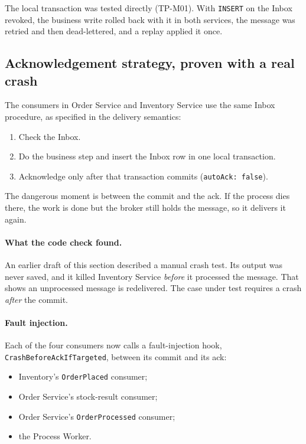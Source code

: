 \documentclass[a4paper]{report}
\begin{document}
The local transaction was tested directly (TP-M01). With \texttt{INSERT} on
the Inbox revoked, the business write rolled back with it in both services,
the message was retried and then dead-lettered, and a replay applied it once.

\subsection{Acknowledgement strategy, proven with a real crash}

The consumers in Order Service and Inventory Service use the same Inbox
procedure, as specified in the delivery semantics:

\begin{enumerate}
  \item Check the Inbox.
  \item Do the business step and insert the Inbox row in one local
    transaction.
  \item Acknowledge only after that transaction commits
    (\texttt{autoAck: false}).
\end{enumerate}

The dangerous moment is between the commit and the ack. If the process dies
there, the work is done but the broker still holds the message, so it
delivers it again.

\paragraph{What the code check found.} An earlier draft of this section
described a manual crash test. Its output was never saved, and it killed
Inventory Service \emph{before} it processed the message. That shows an
unprocessed message is redelivered. The case under test requires a crash
\emph{after} the commit.

\paragraph{Fault injection.} Each of the four consumers now calls a fault-injection hook,
\texttt{CrashBeforeAckIfTargeted}, between its commit and its
ack:

\begin{itemize}
  \item Inventory's \texttt{OrderPlaced} consumer;
  \item Order Service's stock-result consumer;
  \item Order Service's \texttt{OrderProcessed} consumer;
  \item the Process Worker.
\end{itemize}
\end{document}

